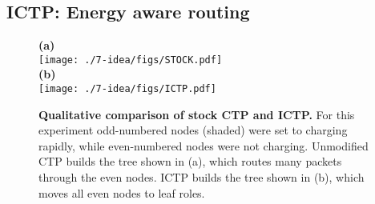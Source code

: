 


\subsection{ICTP: Energy aware routing}

\begin{figure}[t]
\begin{center}
\textbf{(a)}\\
\texttt{[image: ./7-idea/figs/STOCK.pdf]}\\
\textbf{(b)}\\
\texttt{[image: ./7-idea/figs/ICTP.pdf]}\\
\end{center}
\caption{\small{\textbf{Qualitative comparison of stock CTP and ICTP.}
For this experiment odd-numbered nodes (shaded) were set to charging rapidly,
while even-numbered nodes were not charging. Unmodified CTP builds the tree
shown in (a), which routes many packets through the even nodes. ICTP builds
the tree shown in (b), which moves all even nodes to leaf roles.}}
\label{fig-ictpqualitative}
\end{figure}

